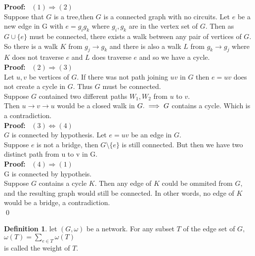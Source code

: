 \documentclass{article}
\theoremstyle{plain}
\theoremstyle{definition}
\newtheorem{defn}{Definition}[section]
\theoremstyle{remark}
\newcommand\Proof{%
    \textbf{Proof:}~%
}
\begin{document}
 \noindent\Proof $(1) \Longrightarrow (2)$\\
 \noindent Suppose that $G$ is a tree,then $G$ is a connected graph with no circuits. Let $e$ be a new edge in G with $e = g_ig_k$ where $g_i,g_k$ are in the vertex set of $G.$ Then as $G \cup \{e\}$ must be connected, there exists a walk between any pair of vertices of $G$. So there is a walk $K$ from $g_j \rightarrow g_k$ and there is also a walk $L$ from $g_k \rightarrow g_j$ where $K$ does not traverse $e$ and $L$ does traverse $e$ and so we have a cycle.\\

\noindent\Proof $(2) \Longrightarrow (3)$\\
\noindent Let $u,v$ be vertices of $G.$ If there was not path joining $uv$ in $G$ then $e = uv$ does not create a cycle in $G.$ Thus $G$ must be connected.\\
\noindent Suppose $G$ contained two different paths $W_1, W_2$ from $u$ to $v.$\\
\noindent Then $ u \longrightarrow v \longrightarrow u$ would be a closed walk in $G. \\ \implies G$ contains a cycle. Which is a contradiction.\\

\noindent\Proof $(3) \Longleftrightarrow (4)$\\
\noindent $G$ is connected by hypothesis. Let $e = uv$ be an edge in $G.$\\
\noindent Suppose $e$ is not a bridge, then $G \setminus \{e\}$ is still connected. But then we have two distinct path from u to v in G.\\

\noindent\Proof $(4) \Longrightarrow (1)$\\
\noindent G is connected by hypotheis.\\
\noindent Suppose $G$ contains a cycle $K.$ Then any edge of $K$ could be ommited from $G,$ and the resulting graph would still be connected. In other words, no edge of $K$ would be a bridge, a contradiction.\\
\qed

\begin{defn}
let $(G,\omega)$ be a network. For any subset $T$ of the edge set of $G,$\\
\indent\indent\indent\indent $\omega (T) = \displaystyle\sum_{e \in T} \omega (T)$\\
\noindent is called the weight of $T.$
\end{defn}
\end{document}
